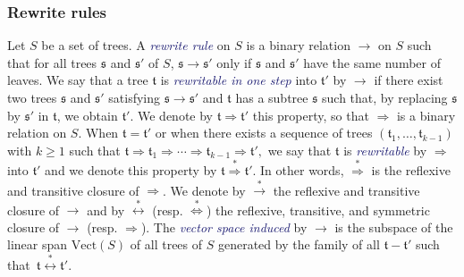 \documentclass[10pt,reqno]{amsart}
\numberwithin{equation}{subsection}
\renewcommand{\geq}{\geqslant}
\newcommand{\Tfr}{\mathfrak{t}}
\newcommand{\Sfr}{\mathfrak{s}}
\newcommand{\Vect}{\mathrm{Vect}}
\newcommand{\Rew}{\to}
\newcommand{\RewTrans}{\overset{*}{\Rew}}
\newcommand{\RewTransSym}{\overset{*}{\leftrightarrow}}
\newcommand{\CRew}{\Rightarrow}
\newcommand{\CRewTrans}{\overset{*}{\CRew}}
\newcommand{\CRewTransSym}{\overset{*}{\Leftrightarrow}}
\newcommand{\Def}[1]{\textcolor{MidnightBlue}{\em #1}}
\begin{document}
\subsubsection{Rewrite rules}
Let $S$ be a set of trees. A \Def{rewrite rule} on $S$ is a binary
relation $\Rew$ on $S$ such that for all trees $\Sfr$ and $\Sfr'$ of
$S$, $\Sfr \Rew \Sfr'$ only if $\Sfr$ and $\Sfr'$ have the same number
of leaves. We say that a tree $\Tfr$ is \Def{rewritable in one step}
into $\Tfr'$ by $\Rew$ if there exist two trees $\Sfr$ and $\Sfr'$
satisfying $\Sfr \Rew \Sfr'$ and $\Tfr$ has a subtree $\Sfr$ such that,
by replacing $\Sfr$ by $\Sfr'$ in $\Tfr$, we obtain $\Tfr'$. We denote
by $\Tfr \CRew \Tfr'$ this property, so that $\CRew$ is a binary
relation on $S$. When $\Tfr = \Tfr'$ or when there exists a sequence of
trees $(\Tfr_1, \dots, \Tfr_{k - 1})$ with $k \geq 1$ such that
\begin{math}
    \Tfr \CRew \Tfr_1 \CRew \cdots \CRew \Tfr_{k - 1} \CRew \Tfr',
\end{math}
we say that $\Tfr$ is \Def{rewritable} by $\CRew$ into $\Tfr'$ and we
denote this property by $\Tfr \CRewTrans \Tfr'$. In other words,
$\CRewTrans$ is the reflexive and transitive closure of $\CRew$.
We denote by $\RewTrans$ the reflexive and transitive closure of $\Rew$
and by $\RewTransSym$ (resp. $\CRewTransSym$) the reflexive, transitive,
and symmetric closure of $\Rew$ (resp. $\CRew$). The \Def{vector space
induced} by $\Rew$ is the subspace of the linear span $\Vect(S)$ of all
trees of $S$ generated by the family of all $\Tfr - \Tfr'$ such
that~$\Tfr \RewTransSym \Tfr'$.
\medskip
\end{document}
